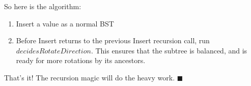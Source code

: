 \documentclass[12pt]{article}
\begin{document}
So here is the algorithm:
\begin{enumerate}
\item Insert a value as a normal BST
\item Before Insert returns to the previous Insert recursion call, run $decidesRotateDirection$. This ensures that the subtree is balanced, and is ready for more rotations by its ancestors.
\end{enumerate}
That's it! The recursion magic will do the heavy work.
\hfill $\blacksquare$
\end{document}
